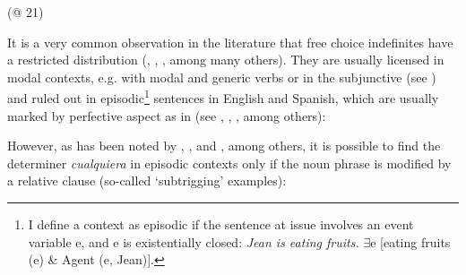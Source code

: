   (@ 21)
\z

It is a very common observation in the literature that free choice indefinites have a restricted distribution (\citealt{Quer2000}, \citealt{Menéndez-Benito2010}, \citealt{Alonso-OvalleMenéndez-Benito2011,am2018}, among many others). They are usually licensed in modal contexts, e.g. with modal and generic verbs or in the subjunctive (see ) and ruled out in episodic\footnote{{I define a context as episodic if the sentence at issue involves an event variable e, and e is existentially closed: \textit{Jean is eating fruits.} ${\exists}$e [eating fruits (e) \& Agent (e, Jean)].}} sentences in English and Spanish, which are usually marked by perfective aspect as in  (see \citealt{Menéndez-Benito2010}, \citealt{AloniEtAl2010}, \citealt{Dayal2013}, among others):

\ea %
\label{bkm:Ref41139913}


    \citep[34]{Menéndez-Benito2010}

\z
\z 

However, as has been noted by \citet{Quer2000}, \citet{Rivero2011}, and \citet{Menéndez-Benito2010}, among others, it is possible to find the determiner \textit{cualquiera} in episodic contexts only if the noun phrase is modified by a relative clause (so-called ‘subtrigging’ examples):


\ea %
\label{bkm:Ref41139369} 
\z
\z

